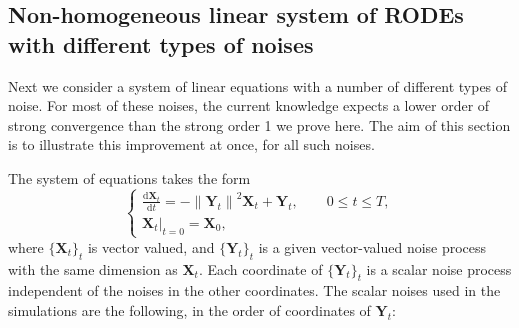 \documentclass[reqno,12pt]{amsart}
\theoremstyle{plain} %
\theoremstyle{definition} %
\begin{document}
\subsection{Non-homogeneous linear system of RODEs with different types of noises}

Next we consider a system of linear equations with a number of different types of noise. For most of these noises, the current knowledge expects a lower order of strong convergence than the strong order 1 we prove here. The aim of this section is to illustrate this improvement at once, for all such noises.

The system of equations takes the form
\begin{equation}
    \label{allnoisesRODEsystem}
    \begin{cases}
        \displaystyle \frac{\mathrm{d}\mathbf{X}_t}{\mathrm{d} t} = - \left\|\mathbf{Y}_t\right\|^2 \mathbf{X}_t + \mathbf{Y}_t, \qquad 0 \leq t \leq T, \\
        \left. \mathbf{X}_t \right|_{t = 0} = \mathbf{X}_0,
    \end{cases}
\end{equation}
where $\{\mathbf{X}_t\}_t$ is vector valued, and $\{\mathbf{Y}_t\}_t$ is a given vector-valued noise process with the same dimension as $\mathbf{X}_t$. Each coordinate of $\{\mathbf{Y}_t\}_t$ is a scalar noise process independent of the noises in the other coordinates. The scalar noises used in the simulations are the following, in the order of coordinates of $\mathbf{Y}_t$:
\end{document}
